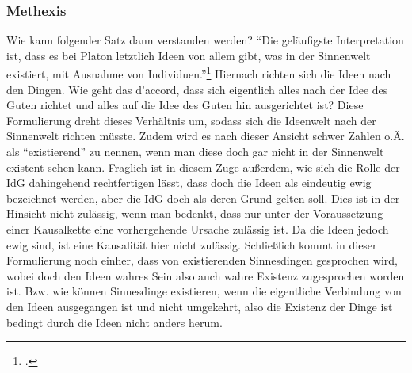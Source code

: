 \subsubsection{Methexis}
Wie kann folgender Satz dann verstanden werden? \enquote{Die geläufigste Interpretation ist, dass es bei Platon letztlich Ideen von allem gibt, was in der Sinnenwelt existiert, mit Ausnahme von Individuen.}\footcite[][S. 31]{DisseMetaphysik} 
Hiernach richten sich die Ideen nach den Dingen. Wie geht das d'accord, dass sich eigentlich alles nach der Idee des Guten richtet und alles auf die Idee des Guten hin ausgerichtet ist? Diese Formulierung dreht dieses Verhältnis um, sodass sich die Ideenwelt nach der Sinnenwelt richten müsste. Zudem wird es nach dieser Ansicht schwer Zahlen o.Ä. als \enquote{existierend} zu nennen, wenn man diese doch gar nicht in der Sinnenwelt existent sehen kann. 
Fraglich ist in diesem Zuge außerdem, wie sich die Rolle der IdG dahingehend rechtfertigen lässt, dass doch die Ideen als eindeutig ewig bezeichnet werden, aber die IdG doch als deren Grund gelten soll. Dies ist in der Hinsicht nicht zulässig, wenn man bedenkt, dass nur unter der Voraussetzung einer Kausalkette eine vorhergehende Ursache zulässig ist. Da die Ideen jedoch ewig sind, ist eine Kausalität hier nicht zulässig.
Schließlich kommt in dieser Formulierung noch einher, dass von existierenden Sinnesdingen gesprochen wird, wobei doch den Ideen wahres Sein also auch wahre Existenz zugesprochen worden ist. Bzw. wie können Sinnesdinge existieren, wenn die eigentliche Verbindung von den Ideen ausgegangen ist und nicht umgekehrt, also die Existenz der Dinge ist bedingt durch die Ideen nicht anders herum.
